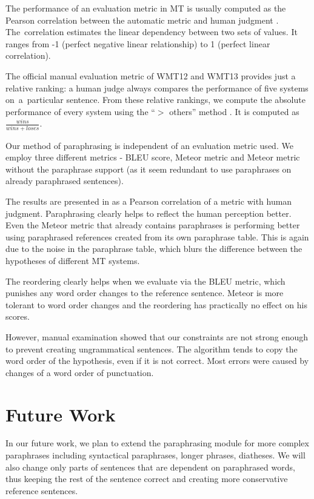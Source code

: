 The performance of an evaluation metric in MT is usually computed as the
Pearson correlation between the automatic metric and human judgment \cite{bleu}. 
The~correlation estimates the linear dependency between two sets of values. 
It ranges from -1 (perfect negative linear relationship) to 1 (perfect linear 
correlation). 

The official manual evaluation metric of WMT12 and WMT13 provides just a 
relative ranking: a human judge always compares the performance of five systems 
on~a~particular sentence. From these relative rankings, we compute the absolute 
performance of every system using the  “$ > $ others” method \cite{bojar-grains}.
It is computed as $ \frac{wins}{wins+loses} $.

Our method of paraphrasing is independent of an evaluation metric used. We 
employ three different metrics - BLEU score, Meteor metric and Meteor metric 
without the paraphrase support (as it seem redundant to use paraphrases on 
already paraphrased sentences). 

The results are presented in  as a Pearson correlation of a 
metric with human judgment. Paraphrasing clearly helps to reflect the human 
perception better. Even the Meteor metric that already contains paraphrases
is performing better using paraphrased references created from its own 
paraphrase table. This is again due to the noise in the paraphrase table, which
blurs the difference between the hypotheses of different MT systems.

The reordering clearly helps when we evaluate via the BLEU metric, which 
punishes any word order changes to the reference sentence. Meteor is more
tolerant to word order changes and the reordering has practically no effect 
on his scores.

However, manual examination showed that our constraints are not strong enough 
to prevent creating ungrammatical sentences. The algorithm tends to copy the
word order of the hypothesis, even if it is not correct. Most errors were caused
by changes of a word order of punctuation. 


\section{Future Work}
In our future work, we plan to extend the paraphrasing module for more 
complex paraphrases including %
syntactical paraphrases, longer phrases,
diatheses. We will also change only parts of sentences that are 
dependent on paraphrased words, thus keeping the rest of the sentence 
correct and creating more conservative reference sentences.

